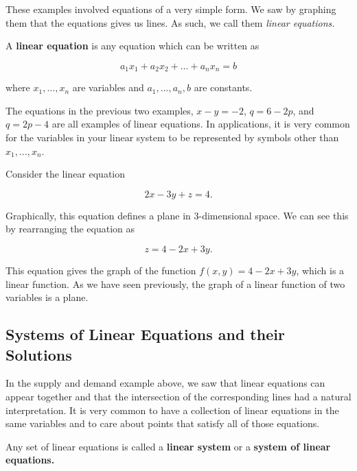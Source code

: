 These examples involved equations of a very simple form. We saw by graphing them that the equations gives us lines. As such, we call them \textit{linear equations.}

\begin{definition}
	A \textbf{linear equation} is any equation which can be written as
	
	$$a_1x_1 + a_2x_2 + \dots + a_nx_n = b$$
	
	\noindent where $x_1,\dots, x_n$ are variables and $a_1,\dots, a_n, b$ are constants.
\end{definition}

\begin{example} 

	The equations in the previous two examples, $x - y = -2$, $q = 6-2p$, and $q = 2p - 4$ are all examples of linear equations. In applications, it is very common for the variables in your linear system to be represented by symbols other than $x_1, \dots, x_n$.

\end{example}

\begin{example}
	Consider the linear equation
	
	$$2x - 3y + z = 4.$$
	
	Graphically, this equation defines a plane in 3-dimensional space. We can see this by rearranging the equation as
	
	$$z = 4 - 2x + 3y.$$
	
	\noindent This equation gives the graph of the function $f(x,y) = 4 - 2x +3y$, which is a linear function. As we have seen previously, the graph of a linear function of two variables is a plane.
\end{example}



\subsection*{Systems of Linear Equations and their Solutions}

In the supply and demand example above, we saw that linear equations can appear together and that the intersection of the corresponding lines had a natural interpretation. It is very common to have a collection of linear equations in the same variables and to care about points that satisfy all of those equations.

\begin{definition}
	Any set of linear equations is called a \textbf{linear system} or a \textbf{system of linear equations.}
\end{definition}


